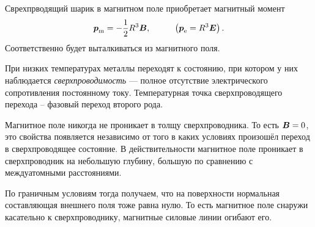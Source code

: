 Сврехпрводящий шарик в магнитном поле приобретает магнитный момент
\begin{equation*}
    \mbox{\boldmath $p$}_{\text{m}} = - \frac{1}{2} R^3 \mbox{\boldmath $B$},
    \hspace{1cm} \left(
    \mbox{\boldmath $p$}_{\text{e}} = R^3 \mbox{\boldmath $E$}
    \right).
\end{equation*}
Соответственно будет выталкиваться из магнитного поля.



При низких температурах металлы переходят к состоянию, при котором у них наблюдается \textit{сверхпроводимость} --- полное отсутствие электрического сопротивления постоянному току. Температурная точка сверхпроводящего перехода -- фазовый переход второго рода.

Магнитное поле никогда не проникает в толщу сверхпроводника. То есть $\mbox{\boldmath $B$} = 0$, это свойства появляется независимо от того в каких условиях произошёл переход в сверхпроводящее состояние. В действительности магнитное поле проникает в сверхпроводник на небольшую глубину, большую по сравнению с междуатомными расстояниями.

По граничным условиям тогда получаем, что на поверхности нормальная составляющая внешнего поля тоже равна нулю. То есть магнитное поле снаружи касательно к сверхпроводнику, магнитные силовые линии огибают его.



